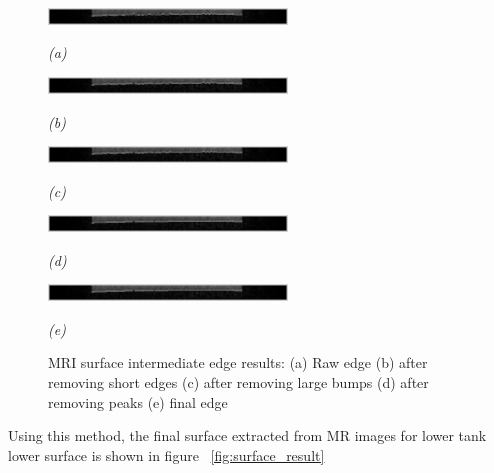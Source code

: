 \begin{figure}[htb]
  \begin{minipage}[b]{2.5in}
    \centering
    \centerline{\mbox{\includegraphics[width=2.5in]{data_extraction/images/MRI/1_raw.eps}}}
    \centerline{\emph{(a)}}
  \end{minipage}
  \begin{minipage}[b]{2.5in}
    \centering
    \centerline{\mbox{\includegraphics[width=2.5in]{data_extraction/images/MRI/2_remove_short_edges.eps}}}
    \centerline{\emph{(b)}}
  \end{minipage}
  \begin{minipage}[b]{2.5in}
    \centering
    \centerline{\mbox{\includegraphics[width=2.5in]{data_extraction/images/MRI/3_remove_large_bumps.eps}}}
    \centerline{\emph{(c)}}
  \end{minipage}
  \begin{minipage}[b]{2.5in}
    \centering
    \centerline{\mbox{\includegraphics[width=2.5in]{data_extraction/images/MRI/4_removed_peaks.eps}}}
    \centerline{\emph{(d)}}
  \end{minipage}
  \begin{minipage}[b]{2.5in}
    \centering
    \centerline{\mbox{\includegraphics[width=2.5in]{data_extraction/images/MRI/5_final_edge.eps}}}
    \centerline{\emph{(e)}}
  \end{minipage}
  \caption{MRI surface intermediate edge results: (a) Raw edge (b) after removing short edges (c) after removing large bumps (d) after removing peaks (e) final edge}
  \label{fig:mri_edge_results}
\end{figure}

Using this method, the final surface extracted from MR images for lower tank lower surface is shown in figure
~\ref{fig:surface_result}

